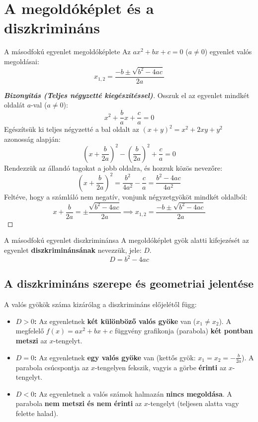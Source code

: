 \documentclass[11pt,a4paper]{article}
\begin{document}
\section{A megoldóképlet és a diszkrimináns}

\begin{tetelbox}{A másodfokú egyenlet megoldóképlete}
    Az $ax^2 + bx + c = 0$ ($a \neq 0$) egyenlet valós megoldásai:
    \begin{equation}
        x_{1,2} = \frac{-b \pm \sqrt{b^2 - 4ac}}{2a}
    \end{equation}
\end{tetelbox}

\begin{proof}[\textbf{Bizonyítás (Teljes négyzetté kiegészítéssel)}]
    Osszuk el az egyenlet mindkét oldalát $a$-val ($a \neq 0$):
    \[
        x^2 + \frac{b}{a}x + \frac{c}{a} = 0
    \]
    Egészítsük ki teljes négyzetté a bal oldalt az $(x+y)^2 = x^2 + 2xy + y^2$ azonosság alapján:
    \[
        \left(x + \frac{b}{2a}\right)^2 - \left(\frac{b}{2a}\right)^2 + \frac{c}{a} = 0
    \]
    Rendezzük az állandó tagokat a jobb oldalra, és hozzuk közös nevezőre:
    \[
        \left(x + \frac{b}{2a}\right)^2 = \frac{b^2}{4a^2} - \frac{c}{a} = \frac{b^2 - 4ac}{4a^2}
    \]
    Feltéve, hogy a számláló nem negatív, vonjunk négyzetgyököt mindkét oldalból:
    \[
        x + \frac{b}{2a} = \pm \frac{\sqrt{b^2 - 4ac}}{2a} \implies x_{1,2} = \frac{-b \pm \sqrt{b^2 - 4ac}}{2a}
    \]
\end{proof}

\begin{definrans}{A másodfokú egyenlet diszkriminánsa}
    A megoldóképlet gyök alatti kifejezését az egyenlet \textbf{diszkriminánsának} nevezzük, jele: $D$.
    \begin{equation}
        D = b^2 - 4ac
    \end{equation}
\end{definrans}

\subsection{A diszkrimináns szerepe és geometriai jelentése}

A valós gyökök száma kizárólag a diszkrimináns előjelétől függ:
\begin{itemize}[leftmargin=*]
    \item \textbf{$D > 0$:} Az egyenletnek \textbf{két különböző valós gyöke} van ($x_1 \neq x_2$). A megfelelő $f(x) = ax^2 + bx + c$ függvény grafikonja (parabola) \textbf{két pontban metszi} az $x$-tengelyt.
    \item \textbf{$D = 0$:} Az egyenletnek \textbf{egy valós gyöke} van (kettős gyök: $x_1 = x_2 = -\frac{b}{2a}$). A parabola csúcspontja az $x$-tengelyen fekszik, vagyis a görbe \textbf{érinti} az $x$-tengelyt.
    \item \textbf{$D < 0$:} Az egyenletnek a valós számok halmazán \textbf{nincs megoldása}. A parabola \textbf{nem metszi és nem érinti} az $x$-tengelyt (teljesen alatta vagy felette halad).
\end{itemize}
\end{document}

